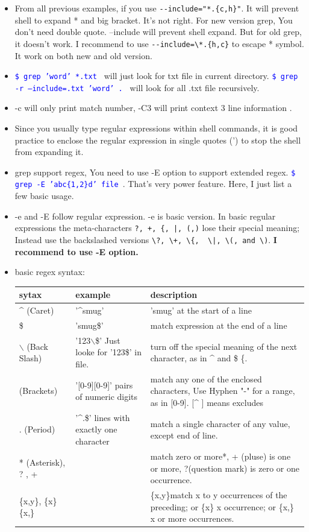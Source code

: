 \documentclass[a4paper,11pt,twoside]{book}
\newcommand{\linuxcommand}[1]{\texttt{\textcolor{blue}{\$ #1 \Pisymbol{psy}{191}}}}
\begin{document}
\begin{itemize}
		\item From all previous examples, if you use \verb!--include="*.{c,h}"!. It will prevent shell to expand * and big bracket. It's not right. For new version grep, You don't need double quote. --include will prevent shell expand. But for old grep, it doesn't work. I recommend to use \verb!--include=\*.{h,c}! to escape * symbol. It work on both new and old version.  

		\item \linuxcommand{grep 'word' *.txt} will just look for txt file in current directory. \linuxcommand{grep -r --include=\*.txt 'word' .} will look for all .txt file recursively.  

		\item -c will only print  match number, -C3 will print context 3 line information .  

		\item Since you usually type regular expressions within shell commands, it is good practice to enclose the regular expression in single quotes (') to stop the shell from expanding it. 

		\item grep support regex, You need to use -E option to support extended regex. \linuxcommand{grep -E 'abc\{1,2\}d' file}.  That's very power feature. Here, I just list a few basic usage. 

		\item -e and -E follow regular expression. -e is basic version. In basic regular expressions the meta-characters \verb=?, +, {, |, (,)= lose their special meaning; Instead use the backslashed versions \verb=\?, \+, \{,  \|, \(, and \)=. \textbf{I recommend to use -E option.}

		\item basic regex syntax:

 \begin{tabular}{p{}|p{}|p{}}
\hline 
sytax 	& example & 	description \\

\hline 
\^{} (Caret)	& '\^{}smug'  & 	'smug' at the start of a line \\
\hline 
\$ &  'smug\$' & 	match expression at the end of a line\\
\hline 
$\backslash$ (Back Slash)&   '123$\backslash$\$'  Just looke for '123\$' in file. &	turn off the special meaning of the next character, as in \^{} and \$ \{.   \\
\hline 
[ ] (Brackets)	&'[0-9][0-9]' pairs of numeric digits &	match any one of the enclosed characters,  Use Hyphen "-" for a range, as in [0-9].  [\^{} ] means excludes\\
\hline 
. (Period) & '\^{}.\$' lines with exactly one character  &	match a single character of any value, except end of line. \\
\hline 
* (Asterisk), ? , + &  &	match zero or more*,  + (pluse) is one or more,   ?(question mark) is zero or one occurrence.   \\
\hline 
\{x,y\}, 	\{x\}	\{x,\} & &	\{x,y\}match x to y occurrences of the preceding;  or \{x\} x occurrence; or  \{x,\} x or more occurrences. \\


\end{tabular}
\end{itemize}
\end{document}
